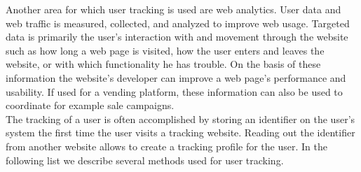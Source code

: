 			Another area for which user tracking is used are web analytics. User data and web traffic is measured, collected, and analyzed to improve web usage. Targeted data is primarily the user's interaction with and movement through the website such as how long a web page is visited, how the user enters and leaves the website, or with which functionality he has trouble. On the basis of these information the website's developer can improve a web page's performance and usability. If used for a vending platform, these information can also be used to coordinate for example sale campaigns. \\
			
			The tracking of a user is often accomplished by storing an identifier on the user's system the first time the user visits a tracking website. Reading out the identifier from another website allows to create a tracking profile for the user. In the following list we describe several methods used for user tracking. \\
			
